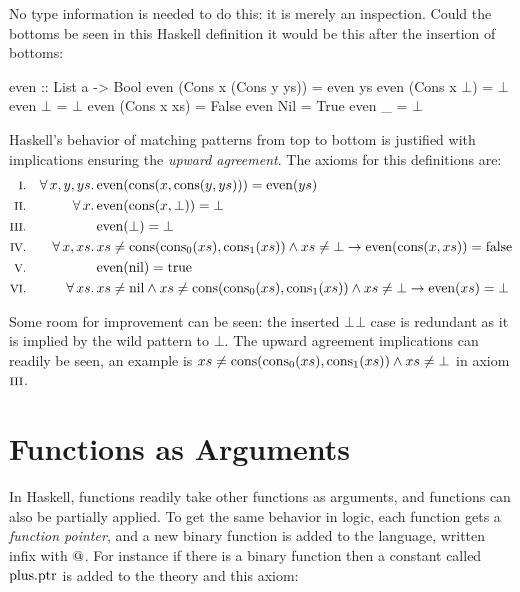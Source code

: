No type information is needed to do this: it is merely an
inspection. Could the bottoms be seen in this Haskell definition it
would be this after the insertion of bottoms:

\begin{code}[mathescape]
even :: List a -> Bool
even (Cons x (Cons y ys)) = even ys
even (Cons x $\bot$)            = $\bot$
even $\bot$                     = $\bot$
even (Cons x xs)          = False
even Nil                  = True
even _                    = $\bot$
\end{code}

Haskell's behavior of matching patterns from top to bottom is
justified with implications ensuring the \emph{upward agreement}. The
axioms for this definitions are:
\newcommand\uncons[1]{\cons{\fn{cons_0}(#1)}{\fn{cons_1}(#1)}}
\newcommand\even[1]{\fn{even}(#1)}
\newcommand\cons[2]{\fn{cons}(#1,#2)}
\begin{align*}
\rom{1} && \faaa{x}{y}{ys} & \even{\cons{x}{\cons{y}{ys}}} = \even{ys} \\
\rom{2} && \fa{x}          & \even{\cons{x}{\bot}}         = \bot      \\
\rom{3} &&                 & \even{\bot} = \bot \\
\rom{4} && \faa{x}{xs}     & xs \neq \uncons{xs} \wedge xs \neq \bot \rightarrow \even{\cons{x}{xs}} = \fn{false}  \\
\rom{5} &&                 & \even{\fn{nil}} = \fn{true} \\
\rom{6} && \fa{xs}         & xs \neq \fn{nil} \wedge
                             xs \neq \uncons{xs} \wedge
                             xs \neq \bot \rightarrow \even{xs} = \bot
\end{align*}

Some room for improvement can be seen: the inserted
$\bot$\hs{ = }$\bot$ case is redundant as it is implied by
the wild pattern to $\bot$. The upward agreement implications can
readily be seen, an example is
$xs \neq \uncons{xs} \wedge xs \neq \bot$ in axiom $\romnodot{3}$.

\section{Functions as Arguments}

In Haskell, functions readily take other functions as arguments, and
functions can also be partially applied. To get the same behavior in
logic, each function gets a \emph{function pointer}, and a new binary
function is added to the language, written infix with $@$.  For
instance if there is a binary function  then a constant
called $\mathrm{plus.ptr}$ is added to the theory and this axiom:

